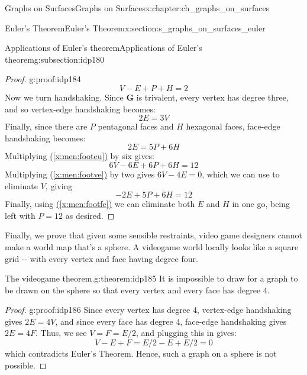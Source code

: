 \documentclass[oneside,10pt,]{book}
\newcommand{\xreffont}{\relax}
\numberwithin{equation}{section}
\newcommand{\bfG}{\mathbf{G}}
\begin{document}
\begin{chapterptx}{Graphs on Surfaces}{}{Graphs on Surfaces}{}{}{x:chapter:ch_graphs_on_surfaces}
\begin{sectionptx}{Euler's Theorem}{}{Euler's Theorem}{}{}{x:section:s_graphs_on_surfaces_euler}
\begin{subsectionptx}{Applications of Euler's theorem}{}{Applications of Euler's theorem}{}{}{g:subsection:idp180}
\begin{proof}{}{g:proof:idp184}
%
\begin{equation}
V-E+P+H=2\label{x:men:footeu}
\end{equation}
Now we turn handshaking.  Since \(\bfG\) is trivalent, every vertex has degree three, and so vertex-edge handshaking becomes:%
%
\begin{equation}
2E=3V\label{x:men:footve}
\end{equation}
Finally, since there are \(P\) pentagonal faces and \(H\) hexagonal faces, face-edge handshaking becomes:%
%
\begin{equation}
2E=5P+6H\label{x:men:footfe}
\end{equation}
Multiplying \hyperref[x:men:footeu]{({\xreffont\ref{x:men:footeu}})} by six gives:%
%
\begin{equation*}
6V-6E+6P+6H=12
\end{equation*}
Multiplying \hyperref[x:men:footve]{({\xreffont\ref{x:men:footve}})} by two gives \(6V-4E=0\), which we can use to eliminate \(V\), giving%
%
\begin{equation*}
-2E+5P+6H=12
\end{equation*}
Finally, using \hyperref[x:men:footfe]{({\xreffont\ref{x:men:footfe}})} we can eliminate both \(E\) and \(H\) in one go, being left with \(P=12\) as desired.%
\end{proof}
Finally, we prove that given some sensible restraints, video game designers cannot make a world map that's a sphere.  A videogame world locally looks like a square grid -{}-{} with every vertex and face having degree four.%
\begin{theorem}{The videogame theorem.}{}{g:theorem:idp185}%
It is impossible to draw for a graph to be drawn on the sphere so that every vertex and every face has degree 4.%
\end{theorem}
\begin{proof}{}{g:proof:idp186}
Since every vertex has degree 4, vertex-edge handshaking gives \(2E=4V\), and since every face has degree 4, face-edge handshaking gives \(2E=4F\).  Thus, we see \(V=F=E/2\), and plugging this in gives:%
%
\begin{equation*}
V-E+F=E/2-E+E/2=0
\end{equation*}
which contradicts Euler's Theorem.  Hence, such a graph on a sphere is not possible.%
\end{proof}
\end{subsectionptx}
\end{sectionptx}
%
%
\typeout{************************************************}

\end{chapterptx}
\end{document}
